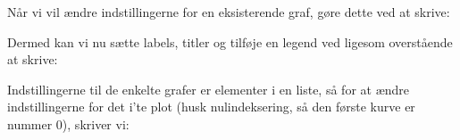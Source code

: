 \documentclass[letterpaper,10pt,english]{jupyterBook}
\begin{document}
\begin{sphinxVerbatim}[commandchars=\\\{\}]
           
\end{sphinxVerbatim}

Når vi vil ændre indstillingerne for en eksisterende graf, gøre dette ved at skrive:

\begin{sphinxVerbatim}[commandchars=\\\{\}]
  
\end{sphinxVerbatim}

Dermed kan vi nu sætte labels, titler og tilføje en legend ved ligesom overstående at skrive:

\begin{sphinxVerbatim}[commandchars=\\\{\}]
  
   
  
  
\end{sphinxVerbatim}

Indstillingerne til de enkelte grafer er elementer i en liste, så for at ændre indstillingerne for det i’te plot (husk nulindeksering, så den første kurve er nummer 0), skriver vi:

\begin{sphinxVerbatim}[commandchars=\\\{\}]
\PYG{p}{[}\PYG{p}{]}  
\end{sphinxVerbatim}
\end{document}
